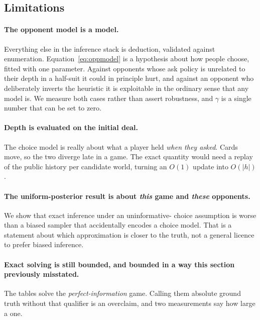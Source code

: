 \documentclass[11pt,letterpaper]{article}
\begin{document}
\subsection{Limitations}
\label{sec:limitations}

\paragraph{The opponent model is a model.} Everything else in the inference
stack is deduction, validated against enumeration. Equation~\eqref{eq:oppmodel}
is a hypothesis about how people choose, fitted with one parameter. Against
opponents whose ask policy is unrelated to their depth in a half-suit it could
in principle hurt, and against an opponent who deliberately inverts the
heuristic it is exploitable in the ordinary sense that any model is. We measure
both cases rather than assert robustness, and $\gamma$ is a single number that
can be set to zero.

\paragraph{Depth is evaluated on the initial deal.} The choice model is really
about what a player held \emph{when they asked}. Cards move, so the two diverge
late in a game. The exact quantity would need a replay of the public history per
candidate world, turning an $O(1)$ update into $O(|h|)$.

\paragraph{The uniform-posterior result is about \emph{this} game and
\emph{these} opponents.} We show that exact inference under an uninformative-
choice assumption is worse than a biased sampler that accidentally encodes a
choice model. That is a statement about which approximation is closer to the
truth, not a general licence to prefer biased inference.

\paragraph{Exact solving is still bounded, and bounded in a way this section
previously misstated.} The tables solve the \emph{perfect-information} game.
Calling them absolute ground truth without that qualifier is an overclaim, and
two measurements say how large a one.
\end{document}
